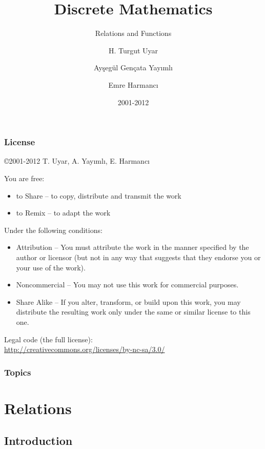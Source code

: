 \documentclass[dvipsnames]{beamer}
\title{Discrete Mathematics}
\subtitle{Relations and Functions}
\author{H. Turgut Uyar \and Ayşegül Gençata Yayımlı \and Emre Harmancı}
\date{2001-2012}
\begin{document}
\begin{frame}
  \titlepage
\end{frame}

\begin{frame}
  \frametitle{License}

  \hfill
  \copyright 2001-2012 T. Uyar, A. Yayımlı, E. Harmancı

  \vfill
  \begin{tiny}
    You are free:
    \begin{itemize}
      \item to Share -- to copy, distribute and transmit the work
      \item to Remix -- to adapt the work
    \end{itemize}

    Under the following conditions:
    \begin{itemize}
      \item Attribution -- You must attribute the work in the manner specified by
        the author or licensor (but not in any way that suggests that they
        endorse you or your use of the work).

      \item Noncommercial -- You may not use this work for commercial purposes.

      \item Share Alike -- If you alter, transform, or build upon this work, you
        may distribute the resulting work only under the same or similar license
        to this one.
    \end{itemize}
  \end{tiny}

  \vfill
  Legal code (the full license):\\
  \url{http://creativecommons.org/licenses/by-nc-sa/3.0/}
\end{frame}

\begin{frame}
  \frametitle{Topics}
  \tableofcontents
\end{frame}

\section{Relations}

\subsection{Introduction}
\end{document}
